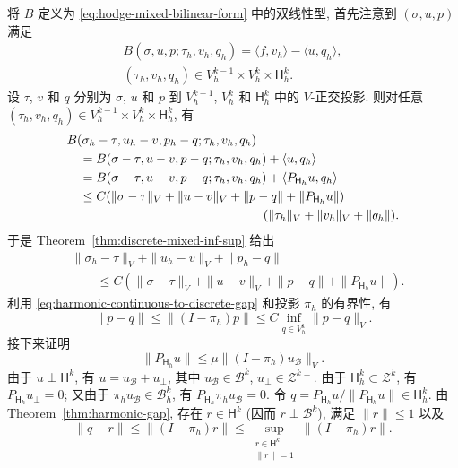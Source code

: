 \begin{Proof}
将 $B$ 定义为 \eqref{eq:hodge-mixed-bilinear-form} 中的双线性型, 首先注意到 $(\sigma,u,p)$ 满足
\[
\begin{gathered}
B(\sigma,u,p;\tau_h,v_h,q_h)=\langle f,v_h\rangle-\langle u,q_h\rangle,\\
(\tau_h,v_h,q_h)\in V_h^{k-1}\times V_h^k\times\mathsf H_h^k.
\end{gathered}
\]
设 $\tau$, $v$ 和 $q$ 分别为 $\sigma$, $u$ 和 $p$ 到 $V_h^{k-1}$, $V_h^k$ 和 $\mathsf H_h^k$ 中的 $V$-正交投影. 则对任意 $(\tau_h,v_h,q_h)\in V_h^{k-1}\times V_h^k\times\mathsf H_h^k$, 有
\[
\begin{aligned}
&B(\sigma_h-\tau,u_h-v,p_h-q;\tau_h,v_h,q_h)\\
&\quad=B(\sigma-\tau,u-v,p-q;\tau_h,v_h,q_h)+\langle u,q_h\rangle\\
&\quad=B(\sigma-\tau,u-v,p-q;\tau_h,v_h,q_h)+\langle P_{\mathsf H_h}u,q_h\rangle\\
&\quad\leq C(\|\sigma-\tau\|_V+\|u-v\|_V+\|p-q\|+\|P_{\mathsf H_h}u\|)\\
&\hspace{55mm}(\|\tau_h\|_V+\|v_h\|_V+\|q_h\|).
\end{aligned}
\]
于是 Theorem~\ref{thm:discrete-mixed-inf-sup} 给出
\begin{equation}\label{eq:mixed-error-discrete-stability}
\begin{aligned}
&\|\sigma_h-\tau\|_V+\|u_h-v\|_V+\|p_h-q\|\\
&\qquad\leq C(\|\sigma-\tau\|_V+\|u-v\|_V+\|p-q\|+\|P_{\mathsf H_h}u\|).
\end{aligned}
\end{equation}
利用 \eqref{eq:harmonic-continuous-to-discrete-gap} 和投影 $\pi_h$ 的有界性, 有
\begin{equation}\label{eq:mixed-error-harmonic-best-approximation}
\|p-q\|\leq\|(I-\pi_h)p\|\leq C\inf_{q\in V_h^k}\|p-q\|_V.
\end{equation}
接下来证明
\[
\|P_{\mathsf H_h}u\|\leq\mu\|(I-\pi_h)u_{\mathcal B}\|_V.
\]
由于 $u\perp\mathsf H^k$, 有 $u=u_{\mathcal B}+u_\perp$, 其中 $u_{\mathcal B}\in\mathcal B^k$, $u_\perp\in\mathcal Z^{k\perp}$. 由于 $\mathsf H_h^k\subset\mathcal Z^k$, 有 $P_{\mathsf H_h}u_\perp=0$; 又由于 $\pi_hu_{\mathcal B}\in\mathcal B_h^k$, 有 $P_{\mathsf H_h}\pi_hu_{\mathcal B}=0$. 令 $q=P_{\mathsf H_h}u/\|P_{\mathsf H_h}u\|\in\mathsf H_h^k$. 由 Theorem~\ref{thm:harmonic-gap}, 存在 $r\in\mathsf H^k$ (因而 $r\perp\mathcal B^k$), 满足 $\|r\|\leq1$ 以及
\[
\|q-r\|\leq\|(I-\pi_h)r\|\leq\sup_{\substack{r\in\mathsf H^k\\\|r\|=1}}\|(I-\pi_h)r\|.
\]
\end{Proof}
